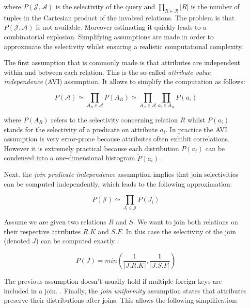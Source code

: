 \documentclass[runningheads]{llncs}
\newcommand{\card}[1]{\left\vert{#1}\right\vert}
\begin{document}
where $P(\mathcal{J}, \mathcal{A})$ is the selectivity of the query and $\prod_{R \in \mathcal{R}} \card{R}$ is the number of tuples in the Cartesian product of the involved relations. The problem is that $P(\mathcal{J}, \mathcal{A})$ is not available. Moreover estimating it quickly leads to a combinatorial explosion. Simplifying assumptions are made in order to approximate the selectivity whilst ensuring a realistic computational complexity.

The first assumption that is commonly made is that attributes are independent within and between each relation. This is the so-called \emph{attribute value independence} (AVI) assumption. It allows to simplify the computation as follows:

\begin{equation}
    P(\mathcal{A}) \simeq \prod_{A_R \in \mathcal{A}} P(A_R) \simeq \prod_{A_R \in \mathcal{A}} \prod_{a_i \in A_R} P(a_i)
\end{equation}

where $P(A_R)$ refers to the selectivity concerning relation $R$ whilst $P(a_i)$ stands for the selectivity of a predicate on attribute $a_i$. In practice the AVI assumption is very error-prone because attributes often exhibit correlations. However it is extremely practical because each distribution $P(a_i)$ can be condensed into a one-dimensional histogram $\widetilde{P}(a_i)$.

Next, the \emph{join predicate independence} assumption implies that join selectivities can be computed independently, which leads to the following approximation:

\begin{equation}
    P(\mathcal{J}) \simeq \prod_{J_i \in \mathcal{J}} P(J_i)
\end{equation}

Assume we are given two relations $R$ and $S$. We want to join both relations on their respective attributes $R.K$ and $S.F$. In this case the selectivity of the join (denoted $J$) can be computed exactly :

\begin{equation}
    P(J) = min(\frac{1}{\card{J.R.K}}, \frac{1}{\card{J.S.F}}) 
\end{equation}

The previous assumption doesn't usually hold if multiple foreign keys are included in a join. . Finally, the \emph{join uniformity} assumption states that attributes preserve their distributions after joins. This allows the following simplification:
\end{document}
